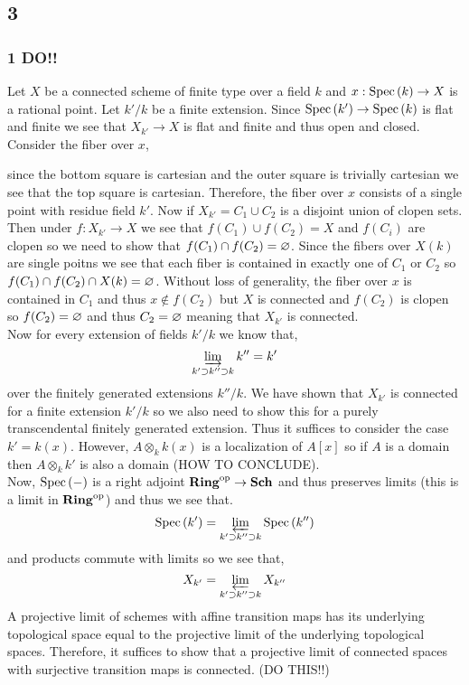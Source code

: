 \documentclass[12pt]{article}
\begin{document}
\subsection{3}

\subsubsection{1 DO!!}

Let $X$ be a connected scheme of finite type over a field $k$ and $x : \mathrm{Spec}\left( k \right) \to X$ is a rational point. Let $k' / k$ be a finite extension. Since $\mathrm{Spec}\left( k' \right) \to \mathrm{Spec}\left( k \right)$ is flat and finite we see that $X_{k'} \to X$ is flat and finite and thus open and closed. Consider the fiber over $x$,
\begin{center}
\end{center}
since the bottom square is cartesian and the outer square is trivially cartesian we see that the top square is cartesian. Therefore, the fiber over $x$ consists of a single point with residue field $k'$. Now if $X_{k'} = C_1 \cup C_2$ is a disjoint union of clopen sets. Then under $f : X_{k'} \to X$ we see that $f(C_1) \cup f(C_2) = X$ and $f(C_i)$ are clopen so we need to show that $f(C_1) \cap f(C_2) = \varnothing$. Since the fibers over $X(k)$ are single poitns we see that each fiber is contained in exactly one of $C_1$ or $C_2$ so $f(C_1) \cap f(C_2) \cap X(k) = \varnothing$. Without loss of generality, the fiber over $x$ is contained in $C_1$ and thus $x \notin f(C_2)$ but $X$ is connected and $f(C_2)$ is clopen so $f(C_2) = \varnothing$ and thus $C_2 = \varnothing$ meaning that $X_{k'}$ is connected.
\bigskip\\
Now for every extension of fields $k' / k$ we know that,
\[ \varinjlim_{k' \supset k'' \supset k} k''  = k' \]
over the finitely generated extensions $k'' / k$. We have shown that $X_{k'}$ is connected for a finite extension $k' / k$ so we also need to show this for a purely transcendental finitely generated extension. Thus it suffices to consider the case $k' = k(x)$. However, $A \otimes_k k(x)$ is a localization of $A[x]$ so if $A$ is a domain then $A \otimes_k k'$ is also a domain (HOW TO CONCLUDE).
\bigskip\\
Now, $\mathrm{Spec}\left( - \right)$ is a right adjoint $\mathbf{Ring}^{\mathrm{op}} \to \mathbf{Sch}$ and thus preserves limits (this is a limit in $\mathbf{Ring}^{\mathrm{op}}$) and thus we see that.
\[ \mathrm{Spec}\left( k' \right) = \varprojlim_{k' \supset k'' \supset k} \mathrm{Spec}\left( k'' \right) \]
and products commute with limits so we see that,
\[ X_{k'} = \varprojlim_{k' \supset k'' \supset k} X_{k''} \]
A projective limit of schemes with affine transition maps has its underlying topological space equal to the projective limit of the underlying topological spaces. Therefore, it suffices to show that a projective limit of connected spaces with surjective transition maps is connected. (DO THIS!!)
\end{document}
